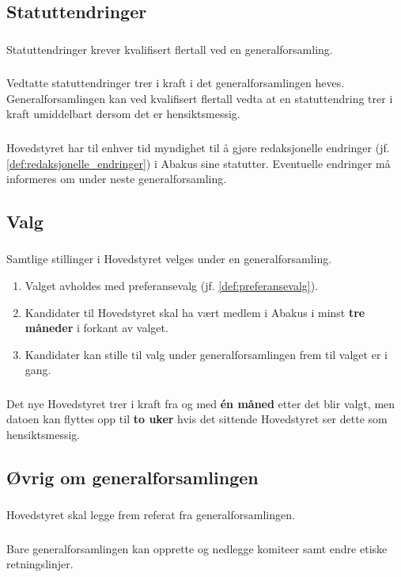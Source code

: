 \subsection{Statuttendringer}
\subsubsection{}
Statuttendringer krever kvalifisert flertall ved en generalforsamling.

\subsubsection{}
Vedtatte statuttendringer trer i kraft i det generalforsamlingen heves. Generalforsamlingen kan ved kvalifisert 
flertall vedta at en statuttendring trer i kraft umiddelbart dersom det er hensiktsmessig.

\subsubsection{}
Hovedstyret har til enhver tid myndighet til å gjøre redaksjonelle endringer (jf. \ref{def:redaksjonelle_endringer}) i
 Abakus sine statutter. Eventuelle endringer må informeres om under neste generalforsamling.

\subsection{Valg}
\subsubsection{}\label{subsec:genfors_valg}
Samtlige stillinger i Hovedstyret velges under en generalforsamling.
\begin{enumerate}[label=\alph*)]
    \item Valget avholdes med preferansevalg (jf. \ref{def:preferansevalg}). 
    \item Kandidater til Hovedstyret skal ha vært medlem i Abakus i minst \textbf{tre måneder} i forkant av valget. 
    \item Kandidater kan stille til valg under generalforsamlingen frem til valget er i gang. 
\end{enumerate}

\subsubsection{}
Det nye Hovedstyret trer i kraft fra og med \textbf{én måned} etter det blir valgt, men datoen kan 
flyttes opp til \textbf{to uker} hvis det sittende Hovedstyret ser dette som hensiktsmessig.

\subsection{Øvrig om generalforsamlingen}
\subsubsection{}
Hovedstyret skal legge frem referat fra generalforsamlingen.

\subsubsection{}
Bare generalforsamlingen kan opprette og nedlegge komiteer samt endre etiske retningslinjer.

